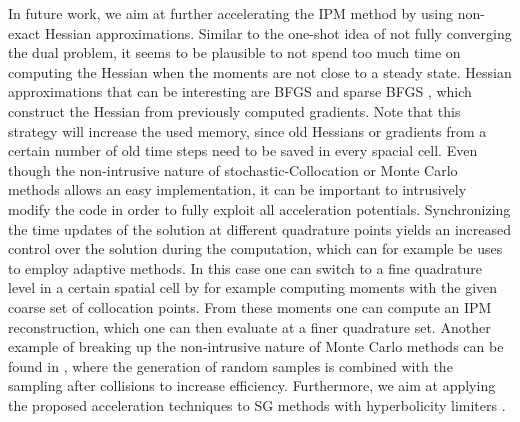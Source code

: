 In future work, we aim at further accelerating the IPM method by using non-exact Hessian approximations. Similar to the one-shot idea of not fully converging the dual problem, it seems to be plausible to not spend too much time on computing the Hessian when the moments are not close to a steady state. Hessian approximations that can be interesting are BFGS and sparse BFGS \cite[Chapter~6.1]{nocedal2006numerical}, which construct the Hessian from previously computed gradients. Note that this strategy will increase the used memory, since old Hessians or gradients from a certain number of old time steps need to be saved in every spacial cell.
Even though the non-intrusive nature of stochastic-Collocation or Monte Carlo methods allows an easy implementation, it can be important to intrusively modify the code in order to fully exploit all acceleration potentials. Synchronizing the time updates of the solution at different quadrature points yields an increased control over the solution during the computation, which can for example be uses to employ adaptive methods. In this case one can switch to a fine quadrature level in a certain spatial cell by for example computing moments with the given coarse set of collocation points. From these moments one can compute an IPM reconstruction, which one can then evaluate at a finer quadrature set. Another example of breaking up the non-intrusive nature of Monte Carlo methods can be found in \cite{poette2019gpc}, where the generation of random samples is combined with the sampling after collisions to increase efficiency. Furthermore, we aim at applying the proposed acceleration techniques to SG methods with hyperbolicity limiters \cite{wu2017stochastic,schlachter2018hyperbolicity}.